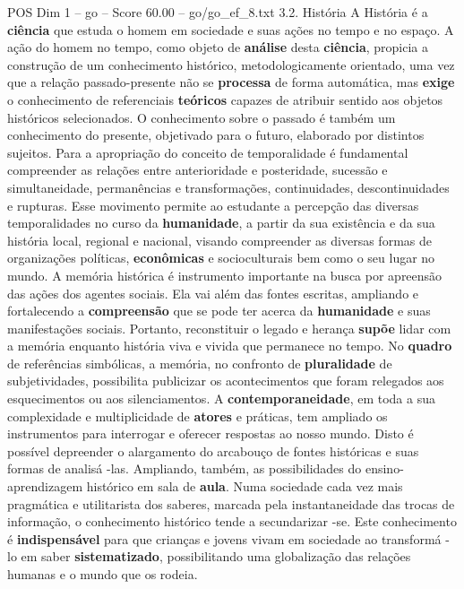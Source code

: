 \begin{textsample}{POS Dim 1 – go – Score 60.00 – go/go\_ef\_8.txt}  \label{ex:f1_pos_093}
3.2.
História A História é a \textbf{ciência} que estuda o homem em sociedade e suas ações no tempo e no espaço.
A ação do homem no tempo, como objeto de \textbf{análise} desta \textbf{ciência}, propicia a construção de um conhecimento histórico, metodologicamente orientado, uma vez que a relação passado-presente não se \textbf{processa} de forma automática, mas \textbf{exige} o conhecimento de referenciais \textbf{teóricos} capazes de atribuir sentido aos objetos históricos selecionados.
O conhecimento sobre o passado é também um conhecimento do presente, objetivado para o futuro, elaborado por distintos sujeitos.
Para a apropriação do conceito de temporalidade é fundamental compreender as relações entre anterioridade e posteridade, sucessão e simultaneidade, permanências e transformações, continuidades, descontinuidades e rupturas.
Esse movimento permite ao estudante a percepção das diversas temporalidades no curso da \textbf{humanidade}, a partir da sua existência e da sua história local, regional e nacional, visando compreender as diversas formas de organizações políticas, \textbf{econômicas} e socioculturais bem como o seu lugar no mundo.
A memória histórica é instrumento importante na busca por apreensão das ações dos agentes sociais.
Ela vai além das fontes escritas, ampliando e fortalecendo a \textbf{compreensão} que se pode ter acerca da \textbf{humanidade} e suas manifestações sociais.
Portanto, reconstituir o legado e herança \textbf{supõe} lidar com a memória enquanto história viva e vivida que permanece no tempo.
No \textbf{quadro} de referências simbólicas, a memória, no confronto de \textbf{pluralidade} de subjetividades, possibilita publicizar os acontecimentos que foram relegados aos esquecimentos ou aos silenciamentos.
A \textbf{contemporaneidade}, em toda a sua complexidade e multiplicidade de \textbf{atores} e práticas, tem ampliado os instrumentos para interrogar e oferecer respostas ao nosso mundo.
Disto é possível depreender o alargamento do arcabouço de fontes históricas e suas formas de analisá -las.
Ampliando, também, as possibilidades do ensino-aprendizagem histórico em sala de \textbf{aula}.
Numa sociedade cada vez mais pragmática e utilitarista dos saberes, marcada pela instantaneidade das trocas de informação, o conhecimento histórico tende a secundarizar -se.
Este conhecimento é \textbf{indispensável} para que crianças e jovens vivam em sociedade ao transformá -lo em saber \textbf{sistematizado}, possibilitando uma globalização das relações humanas e o mundo que os rodeia.

\end{textsample}
